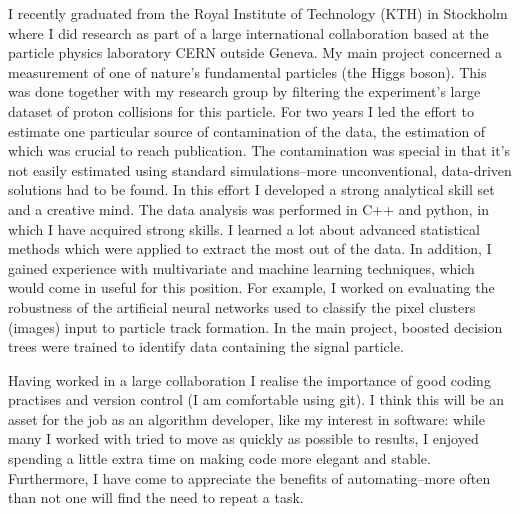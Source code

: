 \documentclass[11pt, a4paper]{../awesome-cv} %
\begin{document}
\begin{cvletter}
I recently graduated from the Royal Institute of Technology (KTH) in Stockholm where I did research as part of a large international collaboration based at the particle physics laboratory CERN outside Geneva.
My main project concerned a measurement of one of nature's fundamental particles (the Higgs boson).
This was done together with my research group by filtering the experiment's large dataset of proton collisions for this particle. %
For two years I led the effort to estimate one particular source of contamination of the data, the estimation of which was crucial to reach publication. 
The contamination was special in that it's not easily estimated using standard simulations–more unconventional, data-driven solutions had to be found.
In this effort I developed a strong analytical skill set and a creative mind. %
The data analysis was performed in C++ and python, in which I have acquired strong skills. %
I learned a lot about advanced statistical methods which were applied to extract the most out of the data.
In addition, I gained experience with multivariate and machine learning techniques, which would come in useful for this position. %
For example, I worked on evaluating the robustness of the artificial neural networks used to classify the pixel clusters (images) input to particle track formation.
In the main project, boosted decision trees were trained to identify data containing the signal particle.  %

Having worked in a large collaboration I realise the importance of good coding practises and version control (I am comfortable using git).
I think this will be an asset for the job as an algorithm developer, like my interest in software: while many I worked with tried to move as quickly as possible to results, I enjoyed spending a little extra time on making code more elegant and stable.
Furthermore, I have come to appreciate the benefits of automating–more often than not one will find the need to repeat a task.


\end{cvletter}
\end{document}
